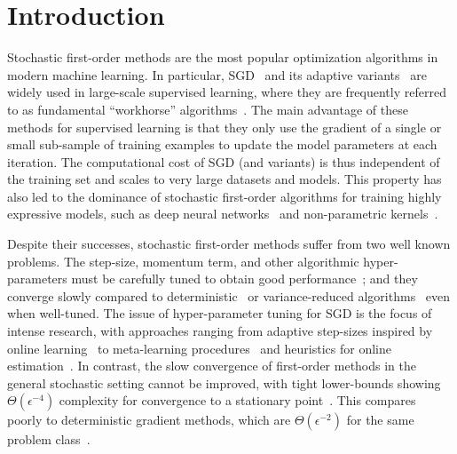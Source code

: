 
\chapter{Introduction}\label{ch:Introduction}

Stochastic first-order methods are the most popular optimization algorithms in modern machine learning.
In particular, \ac{SGD}~\citep{robbins1951sgd} and its adaptive variants~\citep{duchi2011adagrad, tieleman2012rmsprop, zeiler2012adadelta, kingma2015adam} are widely used in large-scale supervised learning, where they are frequently referred to as fundamental ``workhorse'' algorithms~\citep{qian2019improvedrates, assran2019sgpush, grosse2015scaling}. 
The main advantage of these methods for supervised learning is that they only use the gradient of a single or small sub-sample of training examples to update the model parameters at each iteration.
The computational cost of \ac{SGD} (and variants) is thus independent of the training set and scales to very large datasets and models.
This property has also led to the dominance of stochastic first-order algorithms for training highly expressive models, such as deep neural networks~\citep{zhang2017understanding, bengio2012practical} and non-parametric kernels~\citep{liang2018just, belkin2019datainterp}.

Despite their successes, stochastic first-order methods suffer from two well known problems. 
The step-size, momentum term, and other algorithmic hyper-parameters must be carefully tuned to obtain good performance~\citep{bengio2012practical, schaul2013no, li2019convergence, choi2019empirical}; and
they converge slowly compared to deterministic~\citep{nesterov2004lectures} or variance-reduced algorithms~\citep{leroux2012sag, johnson2013svrg, defazio2014saga} even when well-tuned.
The issue of hyper-parameter tuning for \ac{SGD} is the focus of intense research, with approaches ranging from adaptive step-sizes inspired by online learning~\citep{luo2019adabound, li2019convergence, orabona2017coin} to meta-learning procedures~\citep{baydin2018hypergradient, schraudolph1999local, sutton1992gain, almeida1998parameter, plagianakos2001learning, shao2000rates} and heuristics for online estimation~\citep{schaul2013no, rolinek2018l4, tan2016bb}.
In contrast, the slow convergence of first-order methods in the general stochastic setting cannot be improved, with tight lower-bounds showing \( \Theta(\epsilon^{-4}) \) complexity for convergence to a stationary point~\citep{drori2019complexity, arjevani2019lower}.
This compares poorly to deterministic gradient methods, which are \( \Theta(\epsilon^{-2}) \) for the same problem class~\citep{carmon2019lower}.

